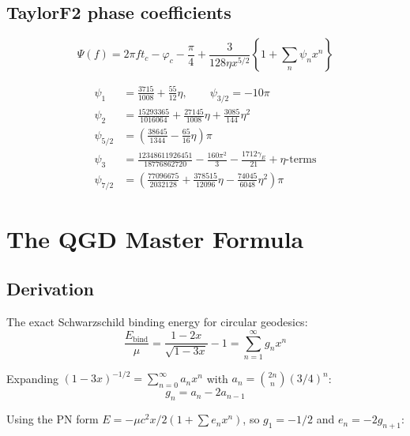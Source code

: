 \documentclass[11pt,a4paper]{article}
\theoremstyle{plain}
\theoremstyle{definition}
\theoremstyle{remark}
\begin{document}
\subsection{TaylorF2 phase coefficients}

\begin{equation}
  \Psi(f) = 2\pi ft_c - \varphi_c - \frac{\pi}{4} + \frac{3}{128\eta x^{5/2}}\left\{1 + \sum_n\psi_n x^n\right\}
\end{equation}

\begin{align}
  \psi_1 &= \frac{3715}{1008} + \frac{55}{12}\eta, \qquad \psi_{3/2} = -10\pi \\
  \psi_2 &= \frac{15293365}{1016064} + \frac{27145}{1008}\eta + \frac{3085}{144}\eta^2 \\
  \psi_{5/2} &= \left(\frac{38645}{1344} - \frac{65}{16}\eta\right)\pi \\
  \psi_3 &= \frac{12348611926451}{18776862720} - \frac{160\pi^2}{3} - \frac{1712\gamma_E}{21} + \eta\text{-terms} \\
  \psi_{7/2} &= \left(\frac{77096675}{2032128} + \frac{378515}{12096}\eta - \frac{74045}{6048}\eta^2\right)\pi
\end{align}

\section{The QGD Master Formula}
\label{sec:master_formula}

\subsection{Derivation}

The exact Schwarzschild binding energy for circular geodesics:
\begin{equation}
  \frac{E_{\mathrm{bind}}}{\mu} = \frac{1-2x}{\sqrt{1-3x}} - 1 = \sum_{n=1}^\infty g_n x^n
  \label{eq:schw_exact}
\end{equation}

Expanding $(1-3x)^{-1/2} = \sum_{n=0}^\infty a_n x^n$ with $a_n = \binom{2n}{n}(3/4)^n$:
\begin{equation}
  g_n = a_n - 2a_{n-1}
\end{equation}

Using the PN form $E = -\mu c^2 x/2(1 + \sum e_n x^n)$, so $g_1 = -1/2$ and $e_n = -2g_{n+1}$:
\end{document}
